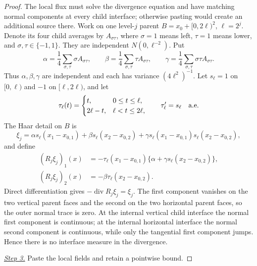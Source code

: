 \documentclass{smfart}
\theoremstyle{definition}
\newcommand{\1}{\mathbf 1}
\begin{document}
\begin{proof}
The local flux must solve the divergence equation and have matching
normal components at every child interface; otherwise pasting would
create an additional source there.  Work on one level-$j$ parent
$B=x_ 0+[0,2\ell)^2$, $\ell=2^j$.  Denote its four child averages by
$A_ {\sigma\tau}$, where $\sigma=1$ means left, $\tau=1$ means lower,
and $\sigma,\tau\in\{-1,1\}$.  They are independent
$N(0,\ell^{-2})$.  Put
\begin{equation*}
\alpha=\frac14\sum_ {\sigma,\tau}\sigma A_ {\sigma\tau},\qquad
\beta =\frac14\sum_ {\sigma,\tau}\tau A_ {\sigma\tau},\qquad
\gamma=\frac14\sum_ {\sigma,\tau}\sigma\tau A_ {\sigma\tau}.
\end{equation*}
Thus $\alpha,\beta,\gamma$ are independent and each has variance
$(4\ell^2)^{-1}$.  Let $s_ \ell=1$ on $[0,\ell)$ and $-1$ on
$[\ell,2\ell)$, and let
\begin{equation*}
\tau_ \ell(t)=\begin{cases}t,&0\leq t\leq\ell,\\
2\ell-t,&\ell<t\leq2\ell,
\end{cases}
\qquad \tau_ \ell'=s_ \ell\quad\hbox{a.e.}
\end{equation*}
The Haar detail on $B$ is
\begin{equation*}
\xi_ j=\alpha s_ \ell(x_ 1-x_ {0,1})+\beta s_ \ell(x_ 2-x_ {0,2})
+\gamma s_ \ell(x_ 1-x_ {0,1})s_ \ell(x_ 2-x_ {0,2}),
\end{equation*}
and define
\begin{equation}
\begin{split}
(R_ j\xi_ j)_ 1(x)&=-\tau_ \ell(x_ 1-x_ {0,1})
\{\alpha+\gamma s_ \ell(x_ 2-x_ {0,2})\},\\
(R_ j\xi_ j)_ 2(x)&=-\beta\tau_ \ell(x_ 2-x_ {0,2}).
\end{split}
\tag{12a}
\end{equation}
Direct differentiation gives $-\operatorname {div}R_ j\xi_ j=\xi_ j$.
The first component vanishes on the two vertical parent faces and the
second on the two horizontal parent faces, so the outer normal trace is
zero.  At the internal vertical child interface the normal first
component is continuous; at the internal horizontal interface the normal
second component is continuous, while only the tangential first component
jumps.  Hence there is no interface measure in the divergence.

\smallskip\noindent
\underline{\textit{Step 3.}} Paste the local fields and retain a pointwise bound.


\end{proof}
\end{document}
